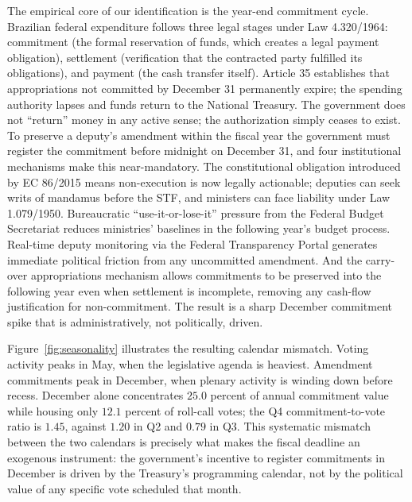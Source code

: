 \documentclass[preprint,12pt,authoryear]{elsarticle}
\begin{document}
The empirical core of our identification is the year-end commitment cycle. Brazilian federal expenditure follows three legal stages under Law 4.320/1964: commitment (the formal reservation of funds, which creates a legal payment obligation), settlement (verification that the contracted party fulfilled its obligations), and payment (the cash transfer itself). Article 35 establishes that appropriations not committed by December 31 permanently expire; the spending authority lapses and funds return to the National Treasury. The government does not ``return'' money in any active sense; the authorization simply ceases to exist. To preserve a deputy's amendment within the fiscal year the government must register the commitment before midnight on December 31, and four institutional mechanisms make this near-mandatory. The constitutional obligation introduced by EC 86/2015 means non-execution is now legally actionable; deputies can seek writs of mandamus before the STF, and ministers can face liability under Law 1.079/1950. Bureaucratic ``use-it-or-lose-it'' pressure from the Federal Budget Secretariat reduces ministries' baselines in the following year's budget process. Real-time deputy monitoring via the Federal Transparency Portal generates immediate political friction from any uncommitted amendment. And the carry-over appropriations mechanism allows commitments to be preserved into the following year even when settlement is incomplete, removing any cash-flow justification for non-commitment. The result is a sharp December commitment spike that is administratively, not politically, driven.

Figure~\ref{fig:seasonality} illustrates the resulting calendar mismatch. Voting activity peaks in May, when the legislative agenda is heaviest. Amendment commitments peak in December, when plenary activity is winding down before recess. December alone concentrates $25.0$ percent of annual commitment value while housing only $12.1$ percent of roll-call votes; the Q4 commitment-to-vote ratio is $1.45$, against $1.20$ in Q2 and $0.79$ in Q3. This systematic mismatch between the two calendars is precisely what makes the fiscal deadline an exogenous instrument: the government's incentive to register commitments in December is driven by the Treasury's programming calendar, not by the political value of any specific vote scheduled that month.
\end{document}
